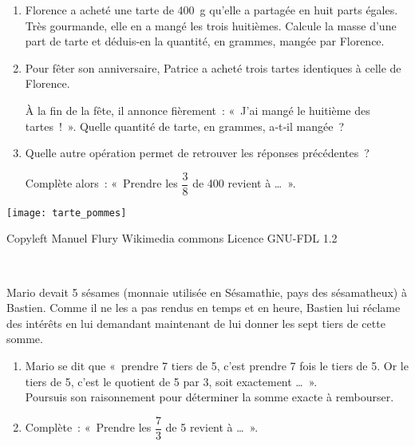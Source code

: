 \begin{activite}

\begin{minipage}[c]{0.7\linewidth}
\begin{partie}
\begin{enumerate}
 \item Florence a acheté une tarte de 400 g qu'elle a partagée en huit parts égales. Très gourmande, elle en a mangé les trois huitièmes. Calcule la masse d'une part de tarte et déduis-en la quantité, en grammes, mangée par Florence.
 \item Pour fêter son anniversaire, Patrice a acheté trois tartes identiques à celle de Florence.
 
À la fin de la fête, il annonce fièrement : « J'ai mangé le huitième des tartes ! ». Quelle quantité de tarte, en grammes, a‑t‑il mangée ?
 \item Quelle autre opération permet de retrouver les réponses précédentes ?
 
Complète alors : « Prendre les $\dfrac{3}{8}$ de 400 revient à \ldots ».
 \end{enumerate}
\end{partie}
\end{minipage} \hfill%
\begin{minipage}[c]{0.27\linewidth}
\begin{center} \texttt{[image: tarte\_pommes]} \end{center}
\begin{center} \quad \tiny{ \phantom{..}Copyleft Manuel Flury \newline \phantom{.........} Wikimedia commons \newline Licence GNU-FDL 1.2} \end{center}
\end{minipage} \\

\begin{partie}
Mario devait 5 sésames (monnaie utilisée en Sésamathie, pays des sésamatheux) à Bastien. 
Comme il ne les a pas rendus en temps et en heure, Bastien lui réclame des intérêts en lui demandant maintenant de lui donner les sept tiers de cette somme.
\begin{enumerate}
 \item Mario se dit que « prendre 7 tiers de 5, c'est prendre 7 fois le tiers de 5. Or le tiers de 5, c'est le quotient de 5 par 3, soit exactement \ldots ». \\[0.5em]
Poursuis son raisonnement pour déterminer la somme exacte à rembourser.
 \item Complète : « Prendre les $\dfrac{7}{3}$ de 5 revient à \ldots ».
 \end{enumerate}
\end{partie}

\end{activite}

